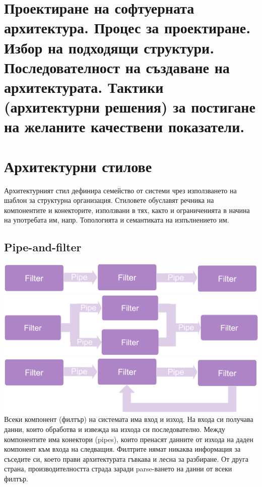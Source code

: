 \documentclass[fleqn,12pt]{article}
\begin{document}
\section{Проектиране на софтуерната архитектура. Процес за проектиране. Избор на
подходящи структури. Последователност на създаване на архитектурата.
Тактики (архитектурни решения) за постигане на желаните качествени
показатели.}
\section{Архитектурни стилове}

Архитектурният стил дефинира семейство от системи чрез използването на
шаблон за структурна организация.
Стиловете обуславят речника на компонентите и конекторите, използвани в тях, както и ограниченията в начина на употребата им, напр. Топологията и семантиката на изпълнението им.

\subsection{Pipe-and-filter}
\includegraphics[width=175mm]{paf_simple.png}
\includegraphics[width=175mm]{paf_branched.png}
\includegraphics[width=175mm]{paf_loop.png}
Всеки компонент (филтър) на системата има вход и изход. На входа си получава данни, които обработва и извежда на изхода си последователно. Между компонентите има конектори (pipes), които пренасят данните от изхода на даден компонент към входа на следващия. Филтрите нямат никаква информация за съседите си, което прави архитектурата гъвкава и лесна за разбиране. От друга страна, производителността страда заради parse-ването на данни от всеки филтър.
\end{document}
